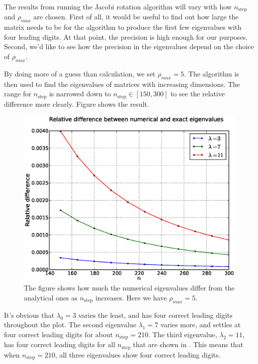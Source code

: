 The results from running the Jacobi rotation algorithm will vary with how 
$n_{\mathrm{step}}$ and $\rho_{max}$ are chosen. First of all, it would be useful to find
out how large the matrix needs to be for the algorithm to produce the first few
eigenvalues with four leading digits. At that point, the precision is high
enough for our purposes. Second, we'd like to see how the precision in the
eigenvalues depend on the choice of $\rho_{max}$. 

By doing more of a guess than calculation, we set $\rho_{max} = 5$. The
algorithm is then used to find the eigenvalues of matrices with increasing
dimensions. The range for $n_{\mathrm{step}}$ is narrowed down to $n_{\mathrm{step}} \in 
[150,300]$ to see the relative difference more clearly. Figure  shows 
the result. 
%
\begin{figure}[htpb]
\centering
\includegraphics[width=1.0\textwidth]{images/nreldiff2.eps}
\caption{The figure shows how much the numerical eigenvalues differ from the analytical
	ones as $n_{\mathrm{step}}$ increases. Here we have $\rho_{max} = 5$.}
\label{fig:nreldiff}
\end{figure}
%
It's obvious that $\lambda_0 = 3$ varies the least, and has four correct leading digits
throughout the plot. The second eigenvalue $\lambda_1 = 7$ varies more, and settles
at four correct leading digits for about $n_{\mathrm{step}} = 210$. The third eigenvalue,
$\lambda_2 = 11$, has four correct leading digits for all $n_{\mathrm{step}}$ that are shown in 
. This means that when $n_{\mathrm{step}} = 210$, all three eigenvalues show 
four correct leading digits. 

